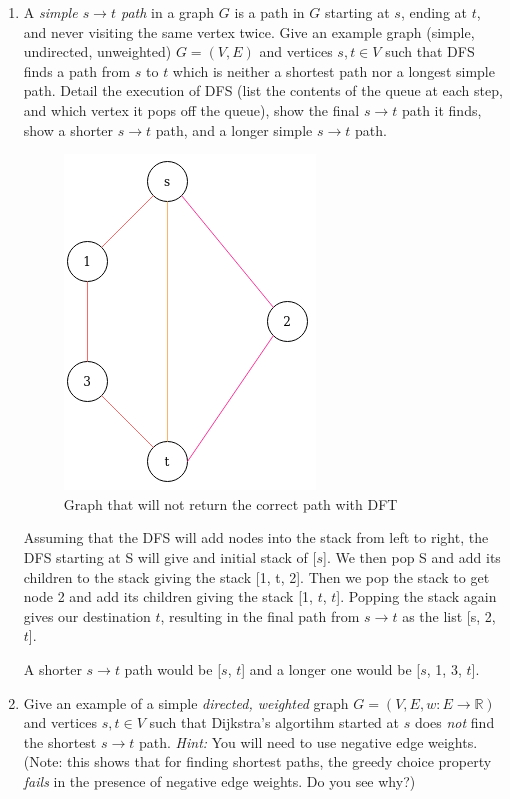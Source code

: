 \documentclass[12pt]{article}
\begin{document}
\begin{enumerate}
\pagebreak

\item \label{2} A \emph{simple $s \to t$ path} in a graph $G$ is a path in $G$ starting at $s$, ending at $t$, and never visiting the same vertex twice. Give an example graph (simple, undirected, unweighted) $G=(V,E)$ and vertices $s,t \in V$ such that DFS finds a path from $s$ to $t$ which is neither a shortest path nor a longest simple path. Detail the execution of DFS (list the contents of the queue at each step, and which vertex it pops off the queue), show the final $s \to t$ path it finds, show a shorter $s \to t$ path, and a longer simple $s \to t$ path.
\pagebreak

\begin{figure}[h!]
	\caption{Graph that will not return the correct path with DFT}
	\centering
	\includegraphics[scale=0.7]{p2-1.png}
\end{figure}

Assuming that the DFS will add nodes into the stack from left to right, the DFS starting at S will give and initial stack of [$s$]. We then pop S and add its children to the stack giving the stack [1, t, 2]. Then we pop the stack to get node 2 and add its children giving the stack [1, $t$, $t$]. Popping the stack again gives our destination $t$, resulting in the final path from $s \to t$ as the list [s, 2, $t$].

A shorter $s \to t$ path would be [$s$, $t$] and a longer one would be [$s$, 1, 3, $t$].
\pagebreak

\item \label{3} Give an example of a simple \emph{directed, weighted} graph $G=(V,E,w\colon E \to \mathbb{R})$ and vertices $s,t \in V$ such that Dijkstra's algortihm started at $s$ does \emph{not} find the shortest $s \to t$ path. \emph{Hint:} You will need to use negative edge weights. (Note: this shows that for finding shortest paths, the greedy choice property \emph{fails} in the presence of negative edge weights. Do you see why?)


\end{enumerate}
\end{document}
